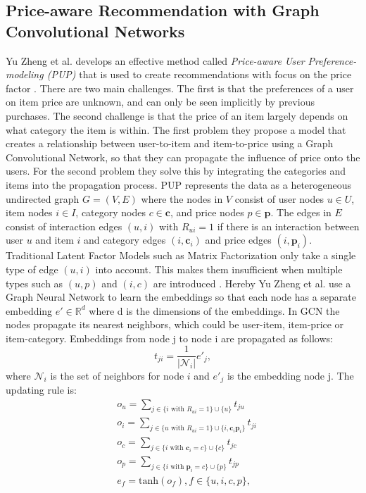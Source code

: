 \subsection{Price-aware Recommendation with Graph Convolutional Networks}
Yu Zheng et al. develops an effective method called \textit{Price-aware User Preference-modeling (PUP)} that is used to create recommendations with focus on the price factor \cite{Priceaware}.
There are two main challenges.
The first is that the preferences of a user on item price are unknown, and can only be seen implicitly by previous purchases.
The second challenge is that the price of an item largely depends on what category the item is within.
The first problem they propose a model that creates a relationship between user-to-item and item-to-price using a Graph Convolutional Network, so that they can propagate the influence of price onto the users.
For the second problem they solve this by integrating the categories and items into the propagation process.
PUP represents the data as a heterogeneous undirected graph $G = (V,E)$ where the nodes in $V$ consist of user nodes $u \in U$, item nodes $i \in I$, category nodes $c \in \textbf{c}$, and price nodes $p \in \textbf{p}$.
The edges in $E$ consist of interaction edges $(u, i)$ with $R_{ui} = 1$ if there is an interaction between user $u$ and item $i$ and category edges $(i, \textbf{c}_i)$ and price edges $(i, \textbf{p}_i)$.
Traditional Latent Factor Models such as Matrix Factorization only take a single type of edge $(u, i)$ into account.
This makes them insufficient when multiple types such as $(u, p)$ and $(i, c)$ are introduced \cite{Priceaware}.
Hereby Yu Zheng et al. use a Graph Neural Network to learn the embeddings so that each node has a separate embedding $e' \in \mathbb{R}^d$ where d is the dimensions of the embeddings.
In GCN the nodes propagate its nearest neighbors, which could be user-item, item-price or item-category.
Embeddings from node j to node i are propagated as follows:
\begin{equation}
    t_{ji} = \frac{1}{|\mathcal{N}_i|}e'_j,
\end{equation}
where $\mathcal{N}_i$ is the set of neighbors for node $i$ and $e'_j$ is the embedding node j.
The updating rule is:
\begin{align*}
     & o_u = \sum_{j \in \{i \textrm{ with } R_{ui}=1 \} \cup \{ u\}}^{} t_{ju}                            \\
     & o_i = \sum_{j \in \{u \textrm{ with } R_{ui}=1 \} \cup \{ i, \textbf{c}_i \textbf{p}_i\}}^{} t_{ji} \\
     & o_c = \sum_{j \in \{i \textrm{ with } \textbf{c}_i=c \} \cup \{ c\}}^{} t_{jc}                      \\
     & o_p = \sum_{j \in \{i \textrm{ with } \textbf{p}_i=c \} \cup \{ p\}}^{} t_{jp}                      \\
     & e_f = \textrm{tanh}(o_f), f \in \{u, i, c, p\},
\end{align*}
